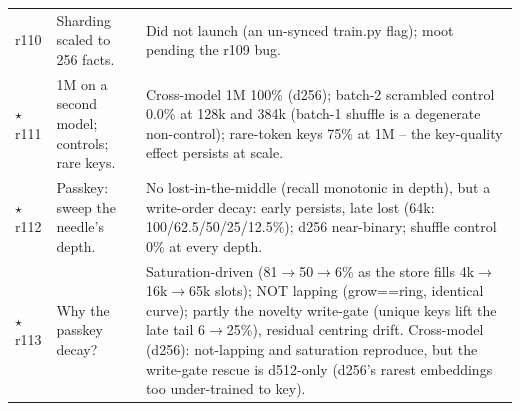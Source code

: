 {\begin{longtable}{@{}p{} p{} p{}@{}}
r110 & Sharding scaled to 256 facts. & Did not launch (an un-synced train.py flag); moot pending the r109 bug. \\
$\star$\,r111 & 1M on a second model; controls; rare keys. & Cross-model 1M 100\% (d256); batch-2 scrambled control 0.0\% at 128k and 384k (batch-1 shuffle is a degenerate non-control); rare-token keys 75\% at 1M -- the key-quality effect persists at scale. \\
$\star$\,r112 & Passkey: sweep the needle's depth. & No lost-in-the-middle (recall monotonic in depth), but a write-order decay: early persists, late lost (64k: 100/62.5/50/25/12.5\%); d256 near-binary; shuffle control 0\% at every depth. \\
$\star$\,r113 & Why the passkey decay? & Saturation-driven (81$\to$50$\to$6\% as the store fills 4k$\to$16k$\to$65k slots); NOT lapping (grow==ring, identical curve); partly the novelty write-gate (unique keys lift the late tail 6$\to$25\%), residual centring drift. Cross-model (d256): not-lapping and saturation reproduce, but the write-gate rescue is d512-only (d256's rarest embeddings too under-trained to key). \\
\end{longtable}
}
